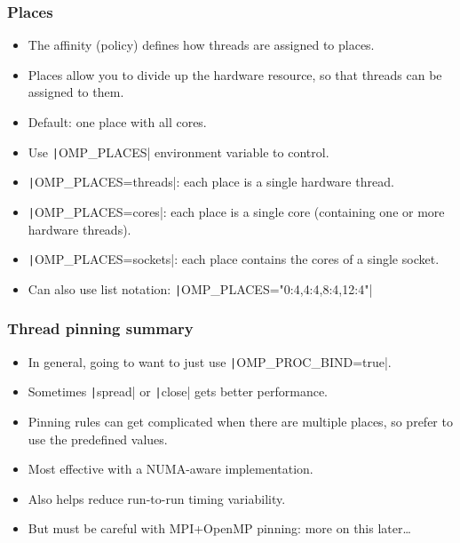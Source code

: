 \documentclass{beamer}
\begin{document}
\begin{frame}
\frametitle{Places}
\begin{itemize}
  \item The affinity (policy) defines how threads are assigned to places.
  \item Places allow you to divide up the hardware resource, so that threads can be assigned to them.
  \item Default: one place with all cores.
  \item Use \texttt|OMP_PLACES| environment variable to control.
  \item \texttt|OMP_PLACES=threads|: each place is a single hardware thread.
  \item \texttt|OMP_PLACES=cores|: each place is a single core (containing one or more hardware threads).
  \item \texttt|OMP_PLACES=sockets|: each place contains the cores of a single socket.
  \item Can also use list notation: \texttt|OMP_PLACES="{0:4},{4:4},{8:4},{12:4}"|
\end{itemize}
\end{frame}

\begin{frame}
\frametitle{Thread pinning summary}
\begin{itemize}
  \item In general, going to want to just use \texttt|OMP_PROC_BIND=true|.
  \item Sometimes \texttt|spread| or \texttt|close| gets better performance.
  \item Pinning rules can get complicated when there are multiple places, so prefer to use the predefined values.
  \item Most effective with a NUMA-aware implementation.
  \item Also helps reduce run-to-run timing variability.
  \item But must be careful with MPI+OpenMP pinning: more on this later\dots
\end{itemize}
\end{frame}

\end{document}
